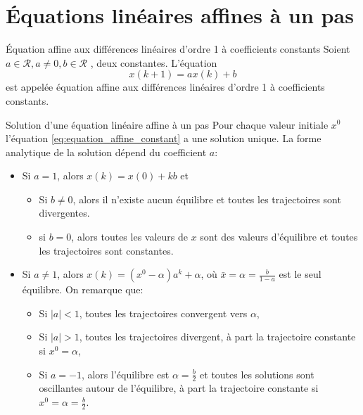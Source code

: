     \section{Équations linéaires affines à un pas}
        \begin{definition}{Équation affine aux différences linéaires d'ordre 1 à coefficients constants}
            Soient $a\in \mathcal{R}, a\neq 0, b\in \mathcal{R}$ , deux constantes. L'équation
            \begin{equation}\label{eq:equation_affine_constant}
                x(k+1) = ax(k)+b
            \end{equation}
            est appelée équation affine aux différences linéaires d'ordre 1 à coefficients constants.
        \end{definition}
        \begin{theorem}{Solution d'une équation linéaire affine à un pas}
            Pour chaque valeur initiale $x^0$ l’équation \ref{eq:equation_affine_constant} a une solution unique. La forme analytique de la solution dépend du coefficient $a$:
            \begin{itemize}
                \item Si $a=1$, alors $x(k) = x(0) + kb$ et
                \begin{itemize}
                    \item Si $b\neq 0$, alors il n’existe aucun équilibre et toutes les trajectoires sont divergentes.
                    \item si $b=0$, alors toutes les valeurs de $x$ sont des valeurs d’équilibre et toutes les trajectoires sont constantes.
                \end{itemize}
                \item Si $a\neq 1$, alors $x(k)=(x^0-\alpha)a^k + \alpha$, où $\bar{x} = \alpha = \frac{b}{1-a}$ est le seul équilibre. On remarque que:
                \begin{itemize}
                    \item Si $|a|<1$, toutes les trajectoires convergent vers $\alpha$,
                    \item Si $|a|>1$, toutes les trajectoires divergent, à part la trajectoire constante si $x^0=\alpha$,
                    \item Si $a=-1$, alors l'équilibre est $\alpha=\frac{b}{2}$ et toutes les solutions sont oscillantes autour de l'équilibre, à part la trajectoire constante si $x^0=\alpha=\frac{b}{2}$.
                \end{itemize}
            \end{itemize}
        \end{theorem}
        
